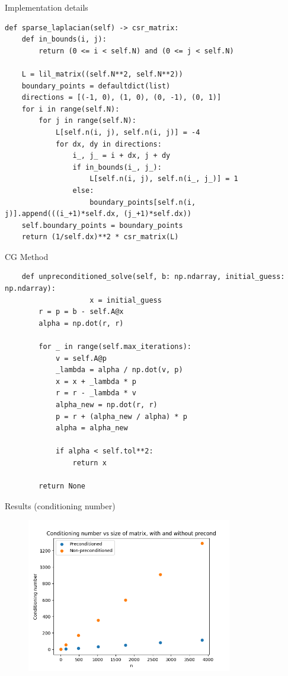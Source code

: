 \documentclass[11pt,aspectratio=1610]{beamer}
\begin{document}
\begin{frame}[fragile]{Implementation details}
\footnotesize
\begin{verbatim}
def sparse_laplacian(self) -> csr_matrix:
    def in_bounds(i, j): 
        return (0 <= i < self.N) and (0 <= j < self.N)
    
    L = lil_matrix((self.N**2, self.N**2)) 
    boundary_points = defaultdict(list) 
    directions = [(-1, 0), (1, 0), (0, -1), (0, 1)]
    for i in range(self.N):
        for j in range(self.N):
            L[self.n(i, j), self.n(i, j)] = -4 
            for dx, dy in directions:
                i_, j_ = i + dx, j + dy
                if in_bounds(i_, j_):
                    L[self.n(i, j), self.n(i_, j_)] = 1
                else:
                    boundary_points[self.n(i, j)].append(((i_+1)*self.dx, (j_+1)*self.dx)) 
    self.boundary_points = boundary_points
    return (1/self.dx)**2 * csr_matrix(L) 
\end{verbatim}
\end{frame}

\begin{frame}[fragile]{CG Method}
\footnotesize
\begin{verbatim}
    def unpreconditioned_solve(self, b: np.ndarray, initial_guess: np.ndarray):
    				x = initial_guess
        r = p = b - self.A@x 
        alpha = np.dot(r, r) 

        for _ in range(self.max_iterations):
            v = self.A@p 
            _lambda = alpha / np.dot(v, p)
            x = x + _lambda * p
            r = r - _lambda * v
            alpha_new = np.dot(r, r)
            p = r + (alpha_new / alpha) * p
            alpha = alpha_new

            if alpha < self.tol**2:
                return x
            
        return None
\end{verbatim}
\end{frame}


\begin{frame}{Results (conditioning number)}
	\begin{figure}
		\includegraphics[width=0.8\textwidth]{../images/conditioning_test.png}
	\end{figure}

\end{frame} 
\end{document}
